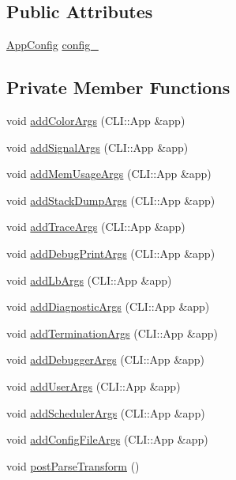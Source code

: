 \subsection*{Public Attributes}
\begin{DoxyCompactItemize}
\item 
\hyperlink{structvt_1_1arguments_1_1_app_config}{App\+Config} \hyperlink{structvt_1_1arguments_1_1_arg_config_af30e0eae1ac1b29f7c85c25636109a9e}{config\+\_\+}
\end{DoxyCompactItemize}
\subsection*{Private Member Functions}
\begin{DoxyCompactItemize}
\item 
void \hyperlink{structvt_1_1arguments_1_1_arg_config_a88f975427c3408ac8ada2add79fb9692}{add\+Color\+Args} (C\+L\+I\+::\+App \&app)
\item 
void \hyperlink{structvt_1_1arguments_1_1_arg_config_ac8c405111103fc7bef367cce277235d4}{add\+Signal\+Args} (C\+L\+I\+::\+App \&app)
\item 
void \hyperlink{structvt_1_1arguments_1_1_arg_config_aef7cb73c09dd2f554a550c2ab54b66f0}{add\+Mem\+Usage\+Args} (C\+L\+I\+::\+App \&app)
\item 
void \hyperlink{structvt_1_1arguments_1_1_arg_config_a0606d4951d3320d9489e65fccc1ab98b}{add\+Stack\+Dump\+Args} (C\+L\+I\+::\+App \&app)
\item 
void \hyperlink{structvt_1_1arguments_1_1_arg_config_ab3de7d531bd7f09c7ea1b37c9e57a02f}{add\+Trace\+Args} (C\+L\+I\+::\+App \&app)
\item 
void \hyperlink{structvt_1_1arguments_1_1_arg_config_afbe3ad33df89d6f702afa1b6e402e9a8}{add\+Debug\+Print\+Args} (C\+L\+I\+::\+App \&app)
\item 
void \hyperlink{structvt_1_1arguments_1_1_arg_config_a4e1787f38e5ed8f4732b9e27011abd24}{add\+Lb\+Args} (C\+L\+I\+::\+App \&app)
\item 
void \hyperlink{structvt_1_1arguments_1_1_arg_config_a8783b70093b5fb9cae74e97b2c428c44}{add\+Diagnostic\+Args} (C\+L\+I\+::\+App \&app)
\item 
void \hyperlink{structvt_1_1arguments_1_1_arg_config_a0504992629228af199a906edc43b4d0a}{add\+Termination\+Args} (C\+L\+I\+::\+App \&app)
\item 
void \hyperlink{structvt_1_1arguments_1_1_arg_config_ad1c8bc76bc17ffd3245331c5cab90f0c}{add\+Debugger\+Args} (C\+L\+I\+::\+App \&app)
\item 
void \hyperlink{structvt_1_1arguments_1_1_arg_config_aa578460e6783d03ce25e349f8affea99}{add\+User\+Args} (C\+L\+I\+::\+App \&app)
\item 
void \hyperlink{structvt_1_1arguments_1_1_arg_config_ad41d94608d841c18dd302c80ed10c52d}{add\+Scheduler\+Args} (C\+L\+I\+::\+App \&app)
\item 
void \hyperlink{structvt_1_1arguments_1_1_arg_config_a05ce6db9c65585991e2e6e2d741b9dc7}{add\+Config\+File\+Args} (C\+L\+I\+::\+App \&app)
\item 
void \hyperlink{structvt_1_1arguments_1_1_arg_config_a688dc6a1e88d8544e2ab41b4db15d8cd}{post\+Parse\+Transform} ()
\end{DoxyCompactItemize}
